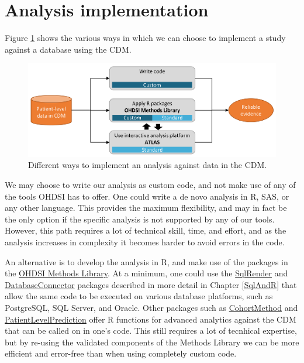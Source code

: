 \documentclass[11pt]{book}
\theoremstyle{definition}
\theoremstyle{definition}
\theoremstyle{definition}
\theoremstyle{remark}
\begin{document}
\hypertarget{analysisImplementation}{%
\section{Analysis implementation}\label{analysisImplementation}}

Figure \ref{fig:implementations} shows the various ways in which we can choose to implement a study against a database using the CDM.

\begin{figure}

{\centering \includegraphics[width=0.9\linewidth]{images/OhdsiAnalyticsTools/implementations} 

}

\caption{Different ways to implement an analysis against data in the CDM.}\label{fig:implementations}
\end{figure}

We may choose to write our analysis as custom code, and not make use of any of the tools OHDSI has to offer. One could write a de novo analysis in R, SAS, or any other language. This provides the maximum flexibility, and may in fact be the only option if the specific analysis is not supported by any of our tools. However, this path requires a lot of technical skill, time, and effort, and as the analysis increases in complexity it becomes harder to avoid errors in the code.

An alternative is to develop the analysis in R, and make use of the packages in the \href{https://ohdsi.github.io/MethodsLibrary/}{OHDSI Methods Library}. At a minimum, one could use the \href{https://ohdsi.github.io/SqlRender/}{SqlRender} and \href{https://ohdsi.github.io/DatabaseConnector/}{DatabaseConnector} packages described in more detail in Chapter \ref{SqlAndR} that allow the same code to be executed on various database platforms, such as PostgreSQL, SQL Server, and Oracle. Other packages such as \href{https://ohdsi.github.io/CohortMethod/}{CohortMethod} and \href{https://ohdsi.github.io/PatientLevelPrediction/}{PatientLevelPrediction} offer R functions for advanced analytics against the CDM that can be called on in one's code. This still requires a lot of tecnhical expertise, but by re-using the validated components of the Methods Library we can be more efficient and error-free than when using completely custom code.
\end{document}
